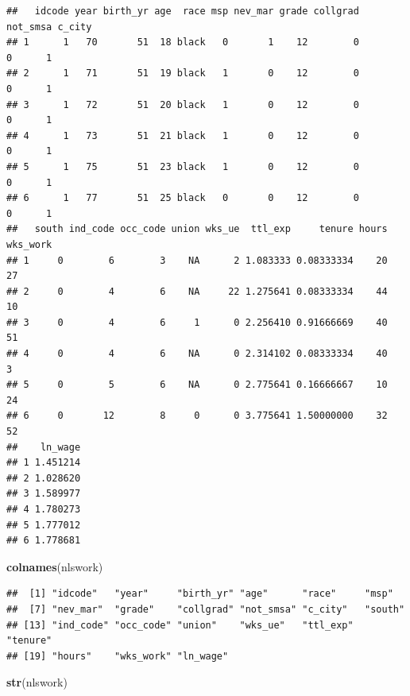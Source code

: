 \documentclass[
]{article}
\newenvironment{Shaded}{\begin{snugshade}}{\end{snugshade}}
\newcommand{\FunctionTok}[1]{\textcolor[rgb]{0.13,0.29,0.53}{\textbf{#1}}}
\newcommand{\NormalTok}[1]{#1}
\begin{document}
\begin{verbatim}
##   idcode year birth_yr age  race msp nev_mar grade collgrad not_smsa c_city
## 1      1   70       51  18 black   0       1    12        0        0      1
## 2      1   71       51  19 black   1       0    12        0        0      1
## 3      1   72       51  20 black   1       0    12        0        0      1
## 4      1   73       51  21 black   1       0    12        0        0      1
## 5      1   75       51  23 black   1       0    12        0        0      1
## 6      1   77       51  25 black   0       0    12        0        0      1
##   south ind_code occ_code union wks_ue  ttl_exp     tenure hours wks_work
## 1     0        6        3    NA      2 1.083333 0.08333334    20       27
## 2     0        4        6    NA     22 1.275641 0.08333334    44       10
## 3     0        4        6     1      0 2.256410 0.91666669    40       51
## 4     0        4        6    NA      0 2.314102 0.08333334    40        3
## 5     0        5        6    NA      0 2.775641 0.16666667    10       24
## 6     0       12        8     0      0 3.775641 1.50000000    32       52
##    ln_wage
## 1 1.451214
## 2 1.028620
## 3 1.589977
## 4 1.780273
## 5 1.777012
## 6 1.778681
\end{verbatim}

\begin{Shaded}
\begin{Highlighting}[]
\FunctionTok{colnames}\NormalTok{(nlswork)}
\end{Highlighting}
\end{Shaded}

\begin{verbatim}
##  [1] "idcode"   "year"     "birth_yr" "age"      "race"     "msp"     
##  [7] "nev_mar"  "grade"    "collgrad" "not_smsa" "c_city"   "south"   
## [13] "ind_code" "occ_code" "union"    "wks_ue"   "ttl_exp"  "tenure"  
## [19] "hours"    "wks_work" "ln_wage"
\end{verbatim}

\begin{Shaded}
\begin{Highlighting}[]
\FunctionTok{str}\NormalTok{(nlswork)}
\end{Highlighting}
\end{Shaded}
\end{document}
